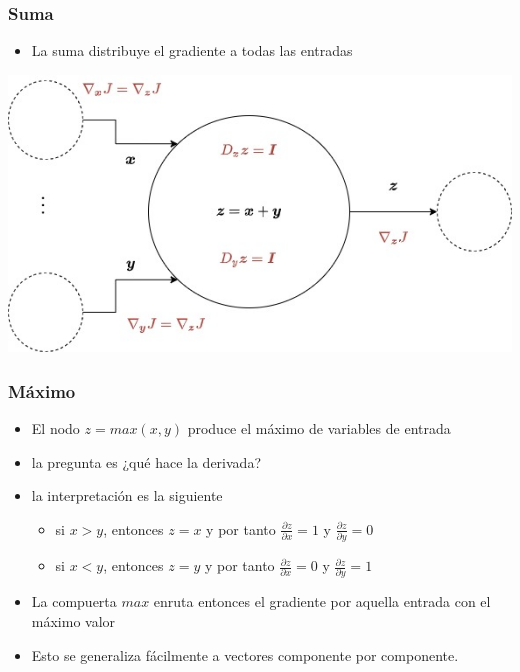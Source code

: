 \documentclass{beamer}
\begin{document}
\begin{frame}
\frametitle{Suma}

\begin{itemize}
\item La suma distribuye el gradiente a todas las entradas
\end{itemize}
\includegraphics[scale=0.35]{im24}
\end{frame}
\begin{frame}
\frametitle{Máximo}

\begin{itemize}
\item El nodo $z=max(x,y)$ produce el máximo de variables de entrada
\item la pregunta es ¿qué hace la derivada?
\item la interpretación es la siguiente
\begin{itemize}
\item si $x>y$, entonces $z=x$ y por tanto $\frac{\partial z}{\partial x}=1$ y $\frac{\partial z}{\partial y}=0$
\item si $x<y$, entonces $z=y$ y por tanto $\frac{\partial z}{\partial x}=0$ y $\frac{\partial z}{\partial y}=1$
\end{itemize}
\item La compuerta $max$ enruta entonces el gradiente por aquella entrada con el máximo valor
\item Esto se generaliza fácilmente a vectores componente por componente.
\end{itemize}
\end{frame}
\end{document}

